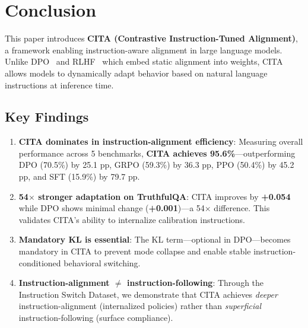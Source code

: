 
\vspace{-2mm}
\section{Conclusion}
\label{sec:conclusion}

This paper introduces \textbf{CITA (Contrastive Instruction-Tuned Alignment)}, a framework enabling instruction-aware alignment in large language models. Unlike DPO~\cite{rafailov2023direct} and RLHF~\cite{ouyang2022training} which embed static alignment into weights, CITA allows models to dynamically adapt behavior based on natural language instructions at inference time.

\vspace{-2mm}
\subsection{Key Findings}
\label{sec:key_findings}

\begin{enumerate}[leftmargin=*,itemsep=2pt]
    \item \textbf{CITA dominates in instruction-alignment efficiency}: Measuring overall performance across 5 benchmarks, \textbf{CITA achieves 95.6\%}---outperforming DPO (70.5\%) by 25.1 pp, GRPO (59.3\%) by 36.3 pp, PPO (50.4\%) by 45.2 pp, and SFT (15.9\%) by 79.7 pp.

    \item \textbf{54$\times$ stronger adaptation on TruthfulQA}: CITA improves by \textbf{+0.054} while DPO shows minimal change (\textbf{+0.001})---a 54$\times$ difference. This validates CITA's ability to internalize calibration instructions.

    \item \textbf{Mandatory KL is essential}: The KL term---optional in DPO---becomes mandatory in CITA to prevent mode collapse and enable stable instruction-conditioned behavioral switching.

    \item \textbf{Instruction-alignment $\neq$ instruction-following}: Through the Instruction Switch Dataset, we demonstrate that CITA achieves \textit{deeper} instruction-alignment (internalized policies) rather than \textit{superficial} instruction-following (surface compliance).
\end{enumerate}

